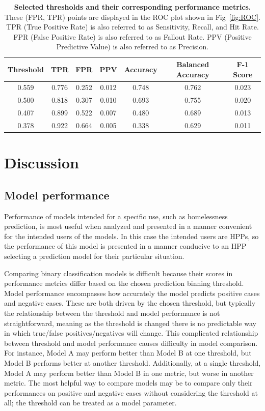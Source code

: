 \documentclass[10pt,letterpaper]{article}
\begin{document}
\begin{table}[htb]
    \centering
    \begin{tabular}{ccccccc}
        \toprule
        Threshold   &   TPR &   FPR & PPV   & Accuracy  &  Balanced Accuracy    & F-1 Score \\
        \midrule
        0.559       & 0.776 & 0.252 & 0.012 &     0.748 &     0.762             & 0.023 \\
        0.500       & 0.818 & 0.307 & 0.010 &     0.693 &     0.755             & 0.020 \\
        0.407       & 0.899 & 0.522 & 0.007 &     0.480 &     0.689             & 0.013 \\
        0.378       & 0.922 & 0.664 & 0.005 &     0.338 &     0.629             & 0.011 \\
        \bottomrule
    \end{tabular}
    \caption{{\bf Selected thresholds and their corresponding performance metrics.} These (FPR, TPR) points are displayed in the ROC plot shown in Fig~\ref{fig:ROC}. TPR (True Positive Rate) is also referred to as Sensitivity, Recall, and Hit Rate. FPR (False Positive Rate) is also referred to as Fallout Rate. PPV (Positive Predictive Value) is also referred to as Precision.}
    \label{tbl:performance}
\end{table}

\section*{Discussion}
\subsection*{Model performance}
Performance of models intended for a specific use, such as homelessness prediction, is most useful when analyzed and presented in a manner convenient for the intended users of the models. In this case the intended users are HPPs, so the performance of this model is presented in a manner conducive to an HPP selecting a prediction model for their particular situation.

Comparing binary classification models is difficult because their scores in performance metrics differ based on the chosen prediction binning threshold. Model performance encompasses how accurately the model predicts positive cases and negative cases. These are both driven by the chosen threshold, but typically the relationship between the threshold and model performance is not straightforward, meaning as the threshold is changed there is no predictable way in which true/false positives/negatives will change. This complicated relationship between threshold and model performance causes difficulty in model comparison. For instance, Model A may perform better than Model B at one threshold, but Model B performs better at another threshold. Additionally, at a single threshold, Model A may perform better than Model B in one metric, but worse in another metric. The most helpful way to compare models may be to compare only their performances on positive and negative cases without considering the threshold at all; the threshold can be treated as a model parameter.
\end{document}
